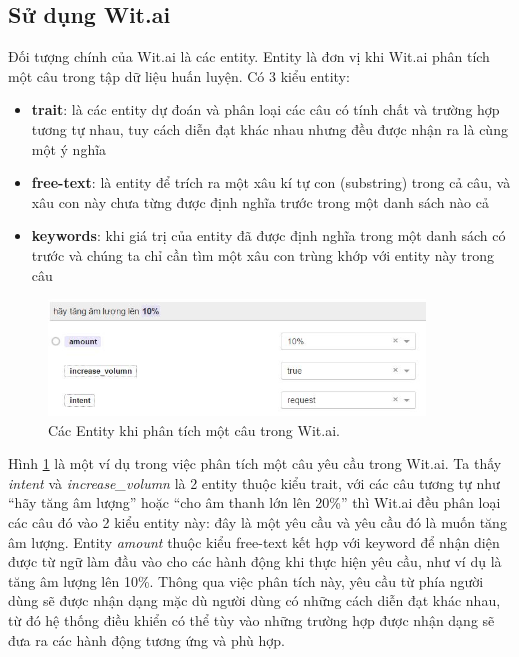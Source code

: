 \documentclass[12pt]{report}
\begin{document}
\subsection{Sử dụng Wit.ai}

Đối tượng chính của Wit.ai là các entity. Entity là đơn vị khi Wit.ai phân tích một câu trong tập dữ liệu huấn luyện. Có 3 kiểu entity:

\begin{itemize}
	\item \textbf{trait}: là các entity dự đoán và phân loại các câu có tính chất và trường hợp tương tự nhau, tuy cách diễn đạt khác nhau nhưng đều được nhận ra là cùng một ý nghĩa
	\item \textbf{free-text}: là entity để trích ra một xâu kí tự con (substring) trong cả câu, và xâu con này chưa từng được định nghĩa trước trong một danh sách nào cả
	\item \textbf{keywords}: khi giá trị của entity đã được định nghĩa trong một danh sách có trước và chúng ta chỉ cần tìm một xâu con trùng khớp với entity này trong câu
\end{itemize}

\begin{figure}[H] 
	\centering
	\includegraphics[width=10cm]{Pics/Chap6/wit.JPG}
	\caption{Các Entity khi phân tích một câu trong Wit.ai.}
	\label{fig:entity}
\end{figure}

Hình \ref{fig:entity} là một ví dụ trong việc phân tích một câu yêu cầu trong Wit.ai. Ta thấy \textit{intent} và \textit{increase\_volumn} là 2 entity thuộc kiểu trait, với các câu tương tự như ``hãy tăng âm lượng'' hoặc ``cho âm thanh lớn lên 20\%'' thì Wit.ai đều phân loại các câu đó vào 2 kiểu entity này: đây là một yêu cầu và yêu cầu đó là muốn tăng âm lượng. Entity \textit{amount} thuộc kiểu free-text kết hợp với keyword để nhận diện được từ ngữ làm đầu vào cho các hành động khi thực hiện yêu cầu, như ví dụ là tăng âm lượng lên 10\%. Thông qua việc phân tích này, yêu cầu từ phía người dùng sẽ được nhận dạng mặc dù người dùng có những cách diễn đạt khác nhau, từ đó hệ thống điều khiển có thể tùy vào những trường hợp được nhận dạng sẽ đưa ra các hành động tương ứng và phù hợp.
\end{document}
